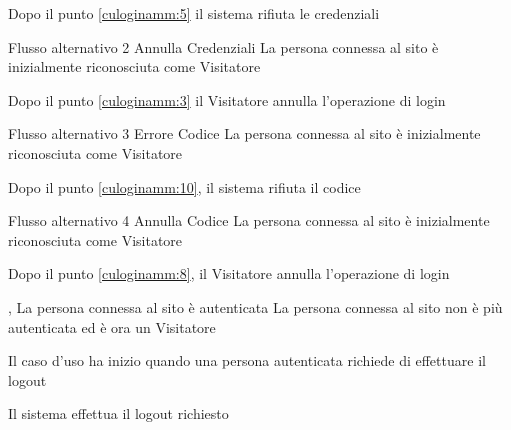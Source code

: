 {\postNulle}%
{\begin{enumCU}
	\item Dopo il punto \ref{culoginamm:5} il sistema rifiuta le credenziali
\end{enumCU}}%
%
{Flusso alternativo 2}%
{Annulla Credenziali}%
{La persona connessa al sito è inizialmente riconosciuta come Visitatore}%
{\postNulle}%
{\begin{enumCU}
		\item Dopo il punto \ref{culoginamm:3} il Visitatore annulla l'operazione di login
\end{enumCU}}%
%
{Flusso alternativo 3}%
{Errore Codice}%
{La persona connessa al sito è inizialmente riconosciuta come Visitatore}%
{\postNulle}%
{\begin{enumCU}
		\item Dopo il punto \ref{culoginamm:10}, il sistema rifiuta il codice
\end{enumCU}}%
%
{Flusso alternativo 4}%
{Annulla Codice}%
{La persona connessa al sito è inizialmente riconosciuta come Visitatore}%
{\postNulle}%
{\begin{enumCU}
		\item Dopo il punto \ref{culoginamm:8}, il Visitatore annulla l'operazione di login
\end{enumCU}}%


{, }
{La persona connessa al sito è autenticata}
{La persona connessa al sito non è più autenticata ed è ora un Visitatore}
{\begin{enumCU}
	\item Il caso d'uso ha inizio quando una persona autenticata richiede di effettuare il logout
	\item Il sistema effettua il logout richiesto
\end{enumCU}}

